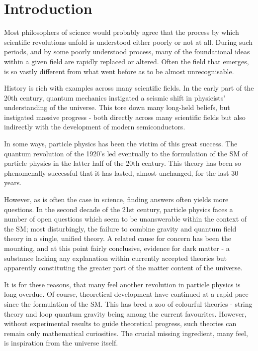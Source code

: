 \chapter*{Introduction}

Most philosophers of science would probably agree that the process by which
scientific revolutions unfold is understood either poorly or not at all. During
such periods, and by some poorly understood process, many of the foundational
ideas within a given field are rapidly replaced or altered. Often the field that
emerges, is so vastly different from what went before as to be almost
unrecognisable.

History is rich with examples across many scientific fields. In the early part
of the 20th century, quantum mechanics instigated a seismic shift in physicists'
understanding of the universe. This tore down many long-held beliefs, but
instigated massive progress - both directly across many scientific fields but
also indirectly with the development of modern semiconductors.

In some ways, particle physics has been the victim of this great success. The
quantum revolution of the 1920's led eventually to the formulation of the
\ac{SM} of particle physics in the latter half of the 20th century. This theory
has been so phenomenally successful that it has lasted, almost unchanged, for
the last 30 years.

However, as is often the case in science, finding answers often yields more
questions. In the second decade of the 21st century, particle physics faces a
number of open questions which seem to be unanswerable within the context of the
\ac{SM}; most disturbingly, the failure to combine gravity and quantum field
theory in a single, unified theory. A related cause for concern has been the
mounting, and at this point fairly conclusive, evidence for dark matter - a
substance lacking any explanation within currently accepted theories but
apparently constituting the greater part of the matter content of the
universe.

It is for these reasons, that many feel another revolution in particle physics
is long overdue. Of course, theoretical development have continued at a rapid
pace since the formulation of the \ac{SM}. This has bred a zoo of colourful
theories - string theory and loop quantum gravity being among the current
favourites. However, without experimental results to guide theoretical progress,
such theories can remain only mathematical curiosities. The crucial missing
ingredient, many feel, is inspiration from the universe itself.


